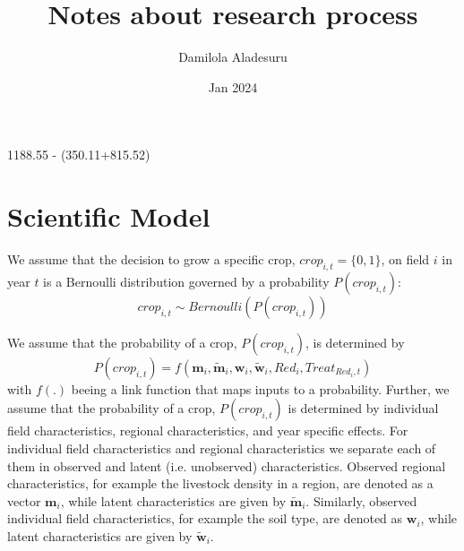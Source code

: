 \documentclass{article}
\title{Notes about research process}
\author{Damilola Aladesuru}
\date{Jan 2024}
\begin{document}
\maketitle

{}

1188.55 - (350.11+815.52)


\section{Scientific Model}


We assume that the decision to grow a specific crop, $crop_{i,t}=\{0,1\}$, 
on field $i$ in year $t$ is a Bernoulli distribution governed by a 
probability $P(crop_{i,t})$:
\begin{equation}
    crop_{i,t} \sim Bernoulli( P(crop_{i,t}))
\end{equation}


We  assume that the probability of a crop, $P(crop_{i,t})$, is determined by 
\begin{equation}  
    P(crop_{i,t}) = f(\mathbf{m}_i,\tilde{\mathbf{m}}_i, \mathbf{w}_i,\tilde{\mathbf{w}}_i,Red_i,Treat_{Red_i,t} )
\end{equation}
with $f(.)$ beeing a link function that maps inputs to a probability.
Further, we assume that the probability of a crop, $P(crop_{i,t})$ 
is determined by individual field characteristics, regional 
characteristics, and year specific effects. 
For individual field characteristics and regional characteristics we separate each of them in 
observed and latent (i.e. unobserved) characteristics. Observed regional characteristics, 
for example the livestock density in a region, are denoted as a vector $\mathbf{m}_i$, 
while latent characteristics are given by $\tilde{\mathbf{m}}_i$. Similarly, 
observed individual field characteristics, for example the soil type, 
are denoted as $\mathbf{w}_i$, while latent characteristics are given 
by $\tilde{\mathbf{w}}_i$.
\end{document}
